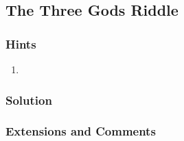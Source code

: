 \subsection{The Three Gods Riddle}

\subsubsection{Hints}

\begin{enumerate}
    \item 
\end{enumerate}

\subsubsection{Solution}



\subsubsection{Extensions and Comments}